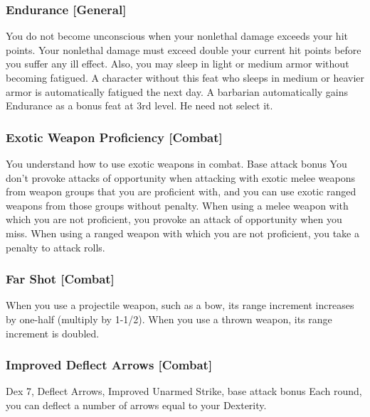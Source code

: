 \subsubsection{Endurance [General]}
 You do not become unconscious when your nonlethal damage exceeds your hit points. Your nonlethal damage must exceed double your current hit points before you suffer any ill effect. Also, you may sleep in light or medium armor without becoming fatigued.
 A character without this feat who sleeps in medium or heavier armor is automatically fatigued the next day.
 A barbarian automatically gains Endurance as a bonus feat at 3rd level. He need not select it.

\subsubsection{Exotic Weapon Proficiency [Combat]}
You understand how to use exotic weapons in combat.
 Base attack bonus 
 You don't provoke attacks of opportunity when attacking with exotic melee weapons from weapon groups that you are proficient with, and you can use exotic ranged weapons from those groups without penalty.
 When using a melee weapon with which you are not proficient, you provoke an attack of opportunity when you miss. When using a ranged weapon with which you are not proficient, you take a  penalty to attack rolls.

\subsubsection{Far Shot [Combat]}
 When you use a projectile weapon, such as a bow, its range increment increases by one-half (multiply by 1-1/2). When you use a thrown weapon, its range increment is doubled.

\subsubsection{Improved Deflect Arrows [Combat]}
 Dex 7, Deflect Arrows, Improved Unarmed Strike, base attack bonus 
 Each round, you can deflect a number of arrows equal to your Dexterity.%



